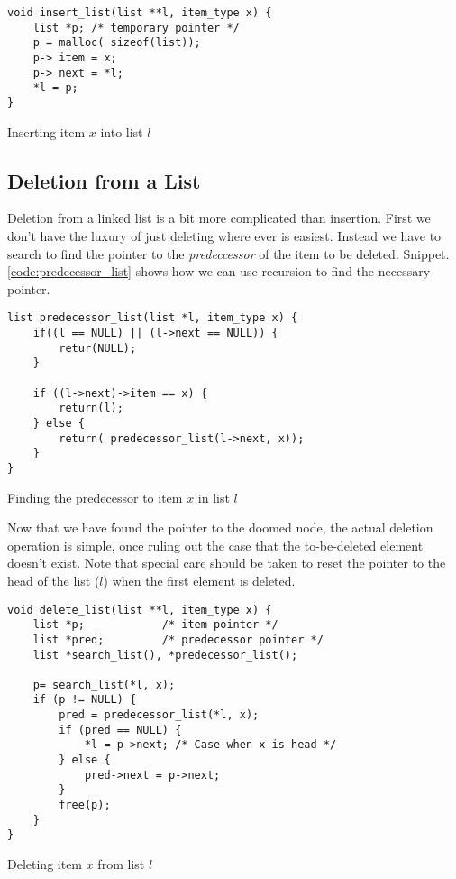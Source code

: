 \begin{listing}[h!]
	\begin{verbatim}
void insert_list(list **l, item_type x) {
	list *p; /* temporary pointer */
	p = malloc( sizeof(list));
	p-> item = x;
	p-> next = *l;
	*l = p;
}
\end{verbatim}
	\caption{\label{code:insert_list} Inserting item $x$ into list $l$}
\end{listing}

	\subsection{Deletion from a List}
		Deletion from a linked list is a bit more complicated than insertion. First we don't have the luxury of just deleting where ever is easiest. Instead we have to search to find the pointer to the \textit{predeccessor} of the item to be deleted. Snippet. \ref{code:predecessor_list} shows how we can use recursion to find the necessary pointer.

\begin{listing}[h!]
	\begin{verbatim}
list predecessor_list(list *l, item_type x) {
	if((l == NULL) || (l->next == NULL)) {
		retur(NULL);
	}

	if ((l->next)->item == x) {
		return(l);
	} else {
		return( predecessor_list(l->next, x));
	}
}
\end{verbatim}
	\caption{\label{code:predecessor_list} Finding the predecessor to item $x$ in list $l$}
\end{listing}

Now that we have found the pointer to the doomed node, the actual deletion operation is simple, once ruling out the case that the to-be-deleted element doesn't exist. Note that special care should be taken to reset the pointer to the head of the list ($l$) when the first element is deleted.

\begin{listing}[h!]
	\begin{verbatim}
void delete_list(list **l, item_type x) {
	list *p;			/* item pointer */
	list *pred; 		/* predecessor pointer */
	list *search_list(), *predecessor_list();

	p= search_list(*l, x);
	if (p != NULL) {
		pred = predecessor_list(*l, x);
		if (pred == NULL) {
			*l = p->next; /* Case when x is head */
		} else {
			pred->next = p->next;
		}
		free(p);
	}
}
\end{verbatim}
	\caption{\label{code:delete_list} Deleting item $x$ from list $l$}
\end{listing}

